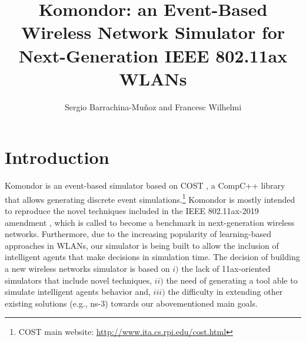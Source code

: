 \documentclass[a4paper]{article}
\title{Komondor: an Event-Based Wireless Network Simulator for Next-Generation IEEE 802.11ax WLANs}
\author{Sergio Barrachina-Mu\~noz and Francesc Wilhelmi}
\begin{document}
\maketitle

%
%

\tableofcontents

\listoffigures

\listoftables

\newpage

\section{Introduction}
\label{section:introduction}

Komondor \cite{barrachina2017komondor} is an event-based simulator based on COST \cite{chen2002reusing}, a CompC++ library that allows generating discrete event simulations.\footnote{COST main website: \url{http://www.ita.cs.rpi.edu/cost.html}} Komondor is mostly intended to reproduce the novel techniques included in the IEEE 802.11ax-2019 amendment \cite{tgax2017draft}, which is called to become a benchmark in next-generation wireless networks. Furthermore, due to the increasing popularity of learning-based approaches in WLANs, our simulator is being built to allow the inclusion of intelligent agents that make decisions in simulation time. The decision of building a new wireless networks simulator is based on $i)$ the lack of 11ax-oriented simulators that include novel techniques, $ii)$ the need of generating a tool able to simulate intelligent agents behavior and, $iii)$ the difficulty in extending other existing solutions (e.g., ns-3) towards our abovementioned main goals. 
	
\end{document}
